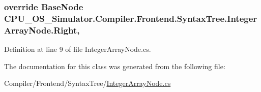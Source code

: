 \subsubsection[{Right}]{\setlength{\rightskip}{0pt plus 5cm}override {\bf Base\+Node} C\+P\+U\+\_\+\+O\+S\+\_\+\+Simulator.\+Compiler.\+Frontend.\+Syntax\+Tree.\+Integer\+Array\+Node.\+Right\hspace{0.3cm}{\ttfamily [get]}, {\ttfamily [set]}}\label{class_c_p_u___o_s___simulator_1_1_compiler_1_1_frontend_1_1_syntax_tree_1_1_integer_array_node_ae5ab5cbf2964c94f7aa990d0d4eab6b5}


Definition at line 9 of file Integer\+Array\+Node.\+cs.



The documentation for this class was generated from the following file\+:\begin{DoxyCompactItemize}
\item 
Compiler/\+Frontend/\+Syntax\+Tree/\hyperlink{_integer_array_node_8cs}{Integer\+Array\+Node.\+cs}\end{DoxyCompactItemize}
